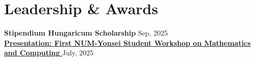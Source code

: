 \documentclass[a4paper,11pt]{article}
\newcommand{\linkicon}{{\footnotesize\faExternalLink*}}
\begin{document}



\vspace{-1.5em}

\section{Leadership \& Awards}
 \textbf{Stipendium Hungaricum Scholarship} \hfill Sep, 2025 \\
 \href{https://docs.google.com/presentation/d/1BvcVU_O69c-oM05ckK0No2ZJ_5Wgpw5ufpk8lP6x6ao/edit?usp=sharing}{\textbf{Presentation: First NUM-Yonsei Student Workshop on Mathematics and Computing \linkicon}} \hfill July, 2025
\end{document}
